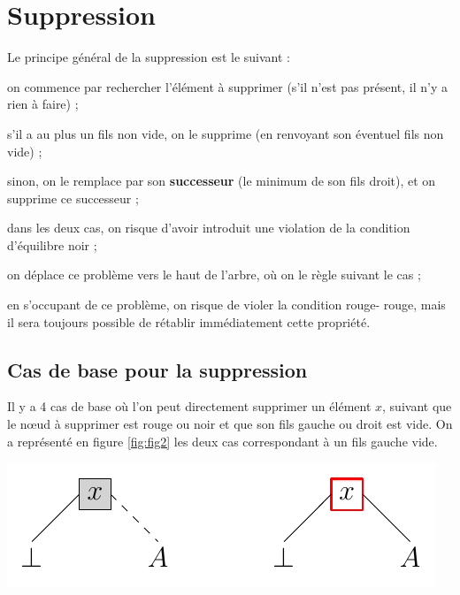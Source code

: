 \documentclass[a4paper,french,bookmarks]{article}
\newcommand{\rouge}{{\color{main9} rouge}}
\begin{document}
\section{Suppression}

Le principe général de la suppression est le suivant :

\begin{enumerate}
    \ithand on commence par rechercher l'élément à supprimer (s'il n'est pas présent, il n'y a rien à faire) ;
    
    \ithand s'il a au plus un fils non vide, on le supprime (en renvoyant son éventuel fils non vide) ;
    
    \ithand sinon, on le remplace par son \textbf{successeur} (le minimum de son fils droit), et on supprime ce successeur ;
    
    \ithand dans les deux cas, on risque d'avoir introduit une violation de la condition d'équilibre noir ;
    
    \ithand on déplace ce problème vers le haut de l'arbre, où on le règle suivant le cas ;

    \ithand en s'occupant de ce problème, on risque de violer la condition \rouge{}-\rouge{}, mais il sera toujours possible de rétablir immédiatement cette propriété.
\end{enumerate}

\subsection{Cas de base pour la suppression}

Il y a 4 cas de base où l'on peut directement supprimer un élément $x$, suivant que le nœud à supprimer est rouge ou noir et que son fils gauche ou droit est vide. On a représenté en figure \ref{fig:fig2} les deux cas correspondant à un fils gauche vide.

\begin{center}
	\includegraphics[scale=0.7]{dm3fig/fig2.png}
	\label{fig:fig2}
\end{center}
\end{document}

